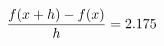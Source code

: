 \documentclass[preview]{standalone}
\begin{document}
\begin{align*}
\special{dvisvgm:raw <g id='unique000'>}\frac{f(x+h)-f(x)}{h} = 2.175\special{dvisvgm:raw </g>}
\end{align*}
\end{document}
